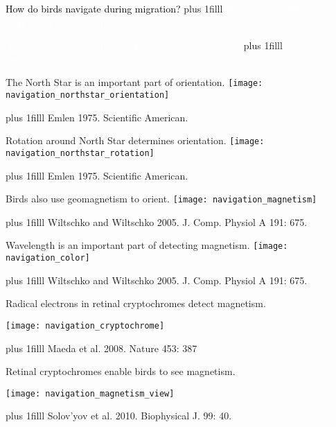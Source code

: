 \documentclass[t]{beamer}
\newcommand\imagecredit[1]{%
	\vskip0pt plus 1filll \tiny #1}%
\begin{document}
{
\begin{frame}[t,plain]{\textcolor{black}{How do birds navigate during migration?}}
	\imagecredit{\hfill\textcolor{white}{Shaffer et al. 2006. Proc. Natl. Acad. Sci. USA 103: 12779}}
\end{frame}
}


{
\begin{frame}[t,plain]{\textcolor{white}{A series of clever experiments revealed navigation cues.}}
	\imagecredit{\hfill\textcolor{white}{www.audubon.org}}
\end{frame}
}

{
\begin{frame}[t,plain]{The North Star is an important part of orientation.}
	\texttt{[image: navigation\_northstar\_orientation]}

	\imagecredit{\hfill Emlen 1975. Scientific American.}
\end{frame}
}

{
\begin{frame}[t,plain]{Rotation around North Star determines orientation.}
	\centering
		\texttt{[image: navigation\_northstar\_rotation]}

	\imagecredit{\hfill Emlen 1975. Scientific American.}
\end{frame}
}

{
\begin{frame}[t,plain]{Birds also use geomagnetism to orient.}
	\centering
		\texttt{[image: navigation\_magnetism]}

	\imagecredit{\hfill Wiltschko and Wiltschko 2005. J. Comp. Physiol A 191: 675.}
\end{frame}
}

{
\begin{frame}[t,plain]{Wavelength is an important part of detecting magnetism.}
	\centering
		\texttt{[image: navigation\_color]}

	\imagecredit{\hfill Wiltschko and Wiltschko 2005. J. Comp. Physiol A 191: 675.}
\end{frame}
}

{
\begin{frame}[t,plain]{Radical electrons in retinal cryptochromes detect magnetism.}
	\begin{center}
		\texttt{[image: navigation\_cryptochrome]}
	\end{center}
	
	\imagecredit{\hfill Maeda et al. 2008. Nature 453: 387}
\end{frame}
}

{
\begin{frame}[t,plain]{Retinal cryptochromes enable birds to see magnetism.}
	\begin{center}
		\texttt{[image: navigation\_magnetism\_view]}
	\end{center}
	
	\imagecredit{\hfill Solov’yov et al. 2010. Biophysical J. 99: 40.}
\end{frame}
}
\end{document}
